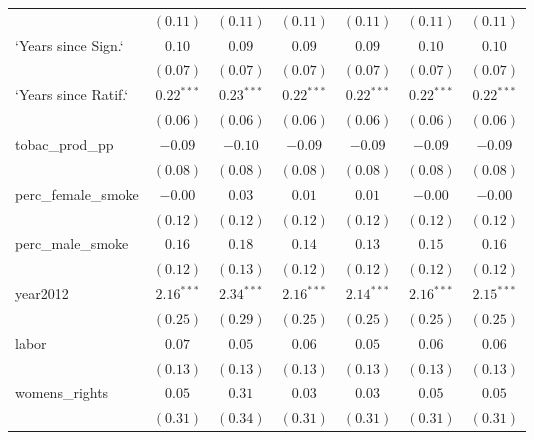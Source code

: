 \begin{table}[!h]
\begin{center}
\begin{tabular}{l c c c c c c }
                        & $(0.11)$     & $(0.11)$     & $(0.11)$     & $(0.11)$     & $(0.11)$     & $(0.11)$     \\
`Years since Sign.`     & $0.10$       & $0.09$       & $0.09$       & $0.09$       & $0.10$       & $0.10$       \\
                        & $(0.07)$     & $(0.07)$     & $(0.07)$     & $(0.07)$     & $(0.07)$     & $(0.07)$     \\
`Years since Ratif.`    & $0.22^{***}$ & $0.23^{***}$ & $0.22^{***}$ & $0.22^{***}$ & $0.22^{***}$ & $0.22^{***}$ \\
                        & $(0.06)$     & $(0.06)$     & $(0.06)$     & $(0.06)$     & $(0.06)$     & $(0.06)$     \\
tobac\_prod\_pp         & $-0.09$      & $-0.10$      & $-0.09$      & $-0.09$      & $-0.09$      & $-0.09$      \\
                        & $(0.08)$     & $(0.08)$     & $(0.08)$     & $(0.08)$     & $(0.08)$     & $(0.08)$     \\
perc\_female\_smoke     & $-0.00$      & $0.03$       & $0.01$       & $0.01$       & $-0.00$      & $-0.00$      \\
                        & $(0.12)$     & $(0.12)$     & $(0.12)$     & $(0.12)$     & $(0.12)$     & $(0.12)$     \\
perc\_male\_smoke       & $0.16$       & $0.18$       & $0.14$       & $0.13$       & $0.15$       & $0.16$       \\
                        & $(0.12)$     & $(0.13)$     & $(0.12)$     & $(0.12)$     & $(0.12)$     & $(0.12)$     \\
year2012                & $2.16^{***}$ & $2.34^{***}$ & $2.16^{***}$ & $2.14^{***}$ & $2.16^{***}$ & $2.15^{***}$ \\
                        & $(0.25)$     & $(0.29)$     & $(0.25)$     & $(0.25)$     & $(0.25)$     & $(0.25)$     \\
labor                   & $0.07$       & $0.05$       & $0.06$       & $0.05$       & $0.06$       & $0.06$       \\
                        & $(0.13)$     & $(0.13)$     & $(0.13)$     & $(0.13)$     & $(0.13)$     & $(0.13)$     \\
womens\_rights          & $0.05$       & $0.31$       & $0.03$       & $0.03$       & $0.05$       & $0.05$       \\
                        & $(0.31)$     & $(0.34)$     & $(0.31)$     & $(0.31)$     & $(0.31)$     & $(0.31)$     \\

\end{tabular}
\end{center}
\end{table}
